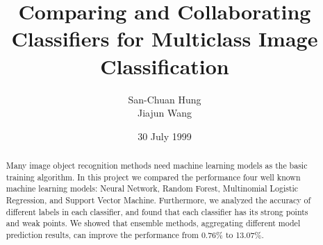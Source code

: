 \documentclass{acm_proc_article-sp}
\begin{document}
\title{Comparing and Collaborating Classifiers for Multiclass Image Classification}

%
%
%
%
%

%
\author{
%
%
\alignauthor
San-Chuan Hung\\
\alignauthor
Jiajun Wang\\
}
\date{30 July 1999}

\maketitle
\begin{abstract}
Many image object recognition methods need machine learning models as the basic training algorithm. In this project we compared the performance four well known machine learning models: Neural Network, Random Forest, Multinomial Logistic Regression, and Support Vector Machine. Furthermore, we analyzed the accuracy of different labels in each classifier, and found that each classifier has its strong points and weak points. We showed that ensemble methods, aggregating different model prediction results, can improve the performance from 0.76\% to 13.07\%.

\end{abstract}
\end{document}
